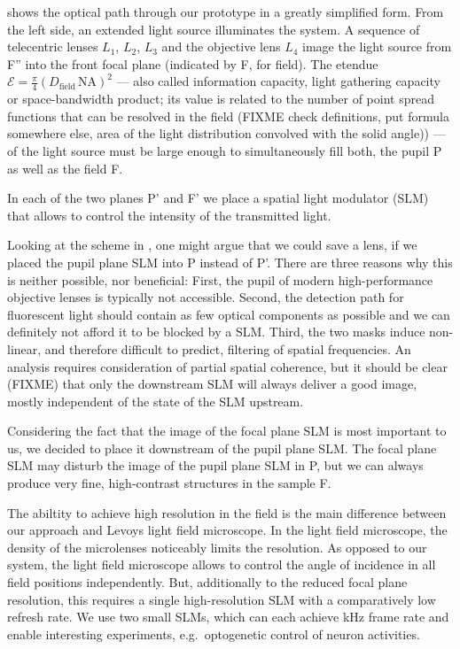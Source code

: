  shows the optical path through our prototype
in a greatly simplified form.  From the left side, an extended light
source illuminates the system. A sequence of telecentric lenses $L_1$,
$L_2$, $L_3$ and the objective lens $L_4$ image the light source from
F'' into the front focal plane (indicated by F, for field). The
etendue $\mathcal{E}=\frac{\pi}{4}(D_\textrm{field}\,\textrm{NA})^2$ --- also called
information capacity, light gathering capacity or space-bandwidth
product; its value is related to the number of point spread functions
that can be resolved in the field (FIXME check definitions, put
formula somewhere else, area of the light distribution convolved with
the solid angle)) --- of the light source must be large enough to
simultaneously fill both, the pupil P as well as the field F.

In each of the two planes P' and F' we place a spatial light modulator
(SLM) that allows to control the intensity of the transmitted light.

Looking at the scheme in , one might argue
that we could save a lens, if we placed the pupil plane SLM into P
instead of P'. There are three reasons why this is neither possible,
nor beneficial: First, the pupil of modern high-performance objective
lenses is typically not accessible. Second, the detection path for
fluorescent light should contain as few optical components as possible
and we can definitely not afford it to be blocked by a SLM.  Third,
the two masks induce non-linear, and therefore difficult to predict,
filtering of spatial frequencies. An analysis requires consideration
of partial spatial coherence, but it should be clear (FIXME) that only
the downstream SLM will always deliver a good image, mostly
independent of the state of the SLM upstream.

Considering the fact that the image of the focal plane SLM is most
important to us, we decided to place it downstream of the pupil plane
SLM. The focal plane SLM may disturb the image of the pupil plane SLM
in P, but we can always produce very fine, high-contrast structures in
the sample F.

The abiltity to achieve high resolution in the field is the main
difference between our approach and Levoys light field microscope.  In
the light field microscope, the density of the microlenses noticeably
limits the resolution. As opposed to our system, the light field
microscope allows to control the angle of incidence in all field
positions independently.  But, additionally to the reduced focal plane
resolution, this requires a single high-resolution SLM with a
comparatively low refresh rate. We use two small SLMs, which can each
achieve \unit[1]{kHz} frame rate and enable interesting experiments,
e.g.\ optogenetic control of neuron activities.

